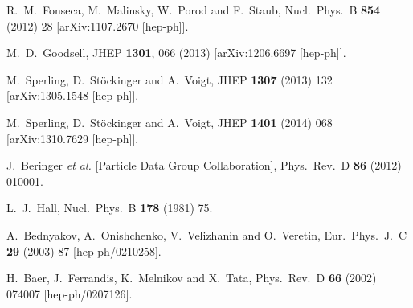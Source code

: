 \documentclass[final,3p,11pt,pdflatex]{elsarticle}
\begin{document}
\begin{thebibliography}{100}
  R.~M.~Fonseca, M.~Malinsky, W.~Porod and F.~Staub,
  Nucl.\ Phys.\ B {\bf 854} (2012) 28
  [arXiv:1107.2670 [hep-ph]].

  M.~D.~Goodsell,
  JHEP {\bf 1301}, 066 (2013)
  [arXiv:1206.6697 [hep-ph]].

  M.~Sperling, D.~Stöckinger and A.~Voigt,
  JHEP {\bf 1307} (2013) 132
  [arXiv:1305.1548 [hep-ph]].

  M.~Sperling, D.~Stöckinger and A.~Voigt,
  JHEP {\bf 1401} (2014) 068
  [arXiv:1310.7629 [hep-ph]].




  J.~Beringer {\it et al.}  [Particle Data Group Collaboration],
  Phys.\ Rev.\ D {\bf 86} (2012) 010001.

  L.~J.~Hall,
  Nucl.\ Phys.\ B {\bf 178} (1981) 75.

  A.~Bednyakov, A.~Onishchenko, V.~Velizhanin and O.~Veretin,
  Eur.\ Phys.\ J.\ C {\bf 29} (2003) 87
  [hep-ph/0210258].

  H.~Baer, J.~Ferrandis, K.~Melnikov and X.~Tata,
  Phys.\ Rev.\ D {\bf 66} (2002) 074007
  [hep-ph/0207126].


\end{thebibliography}
\end{document}
